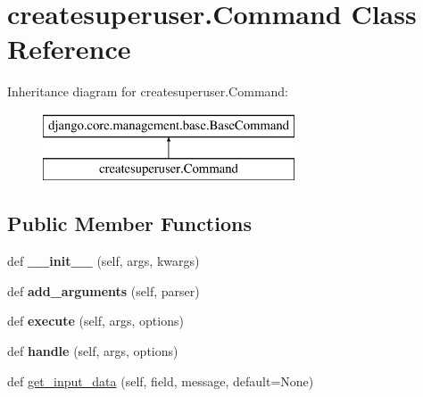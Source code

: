 \hypertarget{classcreatesuperuser_1_1_command}{}\section{createsuperuser.\+Command Class Reference}
\label{classcreatesuperuser_1_1_command}
Inheritance diagram for createsuperuser.\+Command\+:\begin{figure}[H]
\begin{center}
\leavevmode
\includegraphics[height=2.000000cm]{classcreatesuperuser_1_1_command}
\end{center}
\end{figure}
\subsection*{Public Member Functions}
\begin{DoxyCompactItemize}
\item 
\mbox{\label{classcreatesuperuser_1_1_command_aa0583bcc6b54e79fd5593c0e3a0f15ea}} 
def {\bfseries \+\_\+\+\_\+init\+\_\+\+\_\+} (self, args, kwargs)
\item 
\mbox{\label{classcreatesuperuser_1_1_command_a22373f5bde7aa61ee9bf1c2f19f73673}} 
def {\bfseries add\+\_\+arguments} (self, parser)
\item 
\mbox{\label{classcreatesuperuser_1_1_command_a5860ab6aa97f73efd2a62958deec103d}} 
def {\bfseries execute} (self, args, options)
\item 
\mbox{\label{classcreatesuperuser_1_1_command_a5abaa227d9d9c3ff26c1c93b4e063f82}} 
def {\bfseries handle} (self, args, options)
\item 
def \mbox{\hyperlink{classcreatesuperuser_1_1_command_a266caf1cffd3b4105c0e7ae710a12016}{get\+\_\+input\+\_\+data}} (self, field, message, default=None)
\end{DoxyCompactItemize}
